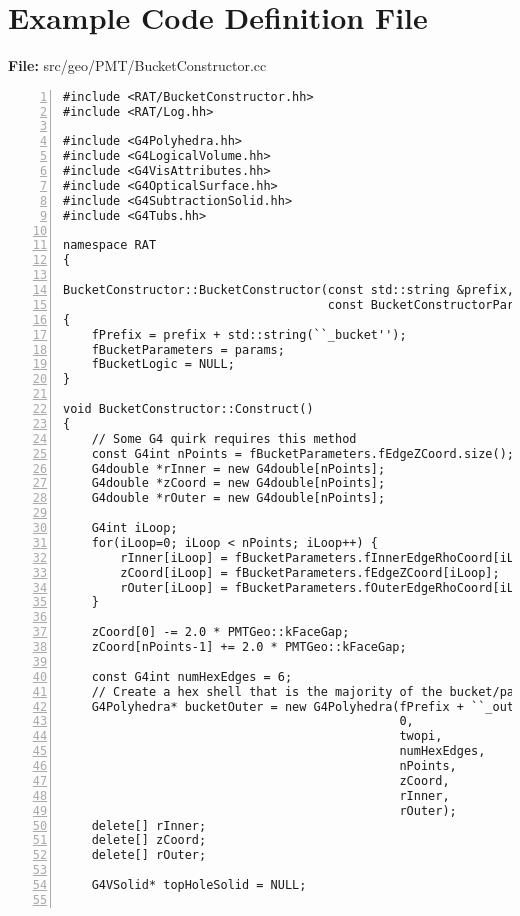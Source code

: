 \documentclass[11pt]{article}
\begin{document}
\section{Example Code Definition File}
\label{sec:ExampleDef}
{\bf File:} src/geo/PMT/BucketConstructor.cc
\begin{Verbatim}[gobble=0,numbers=left]
#include <RAT/BucketConstructor.hh>
#include <RAT/Log.hh>

#include <G4Polyhedra.hh>
#include <G4LogicalVolume.hh>
#include <G4VisAttributes.hh>
#include <G4OpticalSurface.hh>
#include <G4SubtractionSolid.hh>
#include <G4Tubs.hh>

namespace RAT
{

BucketConstructor::BucketConstructor(const std::string &prefix,
                                     const BucketConstructorParams &params)
{
    fPrefix = prefix + std::string(``_bucket'');
    fBucketParameters = params;
    fBucketLogic = NULL;
}

void BucketConstructor::Construct()
{
    // Some G4 quirk requires this method
    const G4int nPoints = fBucketParameters.fEdgeZCoord.size();
    G4double *rInner = new G4double[nPoints];
    G4double *zCoord = new G4double[nPoints];
    G4double *rOuter = new G4double[nPoints];

    G4int iLoop;
    for(iLoop=0; iLoop < nPoints; iLoop++) {
        rInner[iLoop] = fBucketParameters.fInnerEdgeRhoCoord[iLoop];
        zCoord[iLoop] = fBucketParameters.fEdgeZCoord[iLoop];
        rOuter[iLoop] = fBucketParameters.fOuterEdgeRhoCoord[iLoop] - 2.0 * PMTGeo::kFaceGap;
    }

    zCoord[0] -= 2.0 * PMTGeo::kFaceGap;
    zCoord[nPoints-1] += 2.0 * PMTGeo::kFaceGap;

    const G4int numHexEdges = 6;
    // Create a hex shell that is the majority of the bucket/panel-sub-part
    G4Polyhedra* bucketOuter = new G4Polyhedra(fPrefix + ``_outer'',
                                               0,
                                               twopi,
                                               numHexEdges,
                                               nPoints,
                                               zCoord,
                                               rInner,
                                               rOuter);
    delete[] rInner;
    delete[] zCoord;
    delete[] rOuter;

    G4VSolid* topHoleSolid = NULL;


\end{Verbatim}
\end{document}
